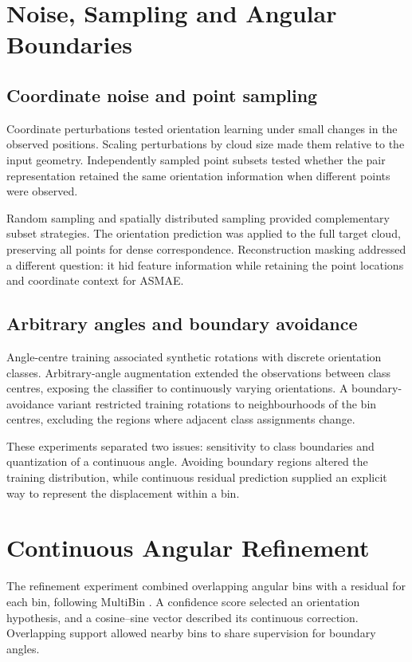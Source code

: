 \section{Noise, Sampling and Angular Boundaries}
\label{app:robustness}
\subsection{Coordinate noise and point sampling}
Coordinate perturbations tested orientation learning under small changes in the observed positions. Scaling perturbations by cloud size made them relative to the input geometry. Independently sampled point subsets tested whether the pair representation retained the same orientation information when different points were observed.

Random sampling and spatially distributed sampling provided complementary subset strategies. The orientation prediction was applied to the full target cloud, preserving all points for dense correspondence. Reconstruction masking addressed a different question: it hid feature information while retaining the point locations and coordinate context for ASMAE.

\subsection{Arbitrary angles and boundary avoidance}
Angle-centre training associated synthetic rotations with discrete orientation classes. Arbitrary-angle augmentation extended the observations between class centres, exposing the classifier to continuously varying orientations. A boundary-avoidance variant restricted training rotations to neighbourhoods of the bin centres, excluding the regions where adjacent class assignments change.

These experiments separated two issues: sensitivity to class boundaries and quantization of a continuous angle. Avoiding boundary regions altered the training distribution, while continuous residual prediction supplied an explicit way to represent the displacement within a bin.

\section{Continuous Angular Refinement}
\label{app:refinement}
The refinement experiment combined overlapping angular bins with a residual for each bin, following MultiBin \citep{Mousavian_2017_MultiBin}. A confidence score selected an orientation hypothesis, and a cosine--sine vector described its continuous correction. Overlapping support allowed nearby bins to share supervision for boundary angles.

